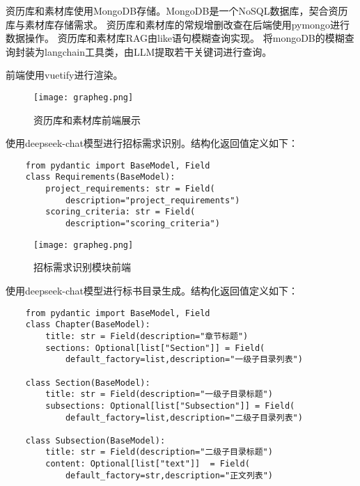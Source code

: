 \documentclass{xmu}
\begin{document}
    资历库和素材库使用MongoDB存储。MongoDB是一个NoSQL数据库，契合资历库与素材库存储需求。
    资历库和素材库的常规增删改查在后端使用pymongo进行数据操作。
    资历库和素材库RAG由like语句模糊查询实现。
    将mongoDB的模糊查询封装为langchain工具类，由LLM提取若干关键词进行查询。
    
    前端使用vuetify进行渲染。
    \begin{figure}[!htb]
        \centering
        \texttt{[image: grapheg.png]}\\
        \caption{资历库和素材库前端展示
        }\label{frontend}
    \end{figure}

    使用deepseek-chat模型进行招标需求识别。结构化返回值定义如下：
    \begin{verbatim}
    from pydantic import BaseModel, Field
    class Requirements(BaseModel):
        project_requirements: str = Field(
            description="project_requirements")
        scoring_criteria: str = Field(
            description="scoring_criteria")
    \end{verbatim}

    \begin{figure}[!htb]
        \centering
        \texttt{[image: grapheg.png]}\\
        \caption{招标需求识别模块前端
        }\label{requirements}
    \end{figure}

    使用deepseek-chat模型进行标书目录生成。结构化返回值定义如下：
    \begin{verbatim}
    from pydantic import BaseModel, Field
    class Chapter(BaseModel):
        title: str = Field(description="章节标题")
        sections: Optional[list["Section"]] = Field(
            default_factory=list,description="一级子目录列表")
    
    class Section(BaseModel):
        title: str = Field(description="一级子目录标题")
        subsections: Optional[list["Subsection"]] = Field(
            default_factory=list,description="二级子目录列表")
        
    class Subsection(BaseModel):
        title: str = Field(description="二级子目录标题")
        content: Optional[list["text"]]  = Field(
            default_factory=str,description="正文列表")
    \end{verbatim}
\end{document}
